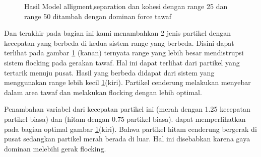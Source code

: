 \begin{figure}
\hfill
{}

\caption{Hasil Model alligment,separation dan kohesi dengan range 25 dan range 50 ditambah dengan dominan force tawaf}
\label{fig:2grafikmodel4gaya}
\end{figure}

Dan terakhir pada bagian ini kami menambahkan 2 jenis partikel dengan kecepatan yang berbeda di kedua sistem range yang berbeda. Disini dapat terlihat pada gambar \ref{fig:2grafikmodel4gaya} (kanan) ternyata range yang lebih besar mendistrupsi sistem flocking pada gerakan tawaf. Hal ini dapat terlihat dari partikel yang tertarik menuju pusat. Hasil yang berbeda didapat dari sistem yang menggunakan range lebih kecil \ref{fig:2grafikmodel4gaya}(kiri). Partikel cenderung melakukan menyebar dalam area tawaf dan melakukan flocking dengan lebih optimal. 

Penambahan variabel dari kecepatan partikel ini (merah dengan 1.25 kecepatan partikel biasa) dan (hitam dengan 0.75 partikel biasa). dapat memperlihatkan pada bagian optimal gambar  \ref{fig:2grafikmodel4gaya}(kiri). Bahwa partikel hitam cenderung bergerak di pusat sedangkan partikel merah berada di luar. Hal ini disebabkan karena gaya dominan melebihi gerak flocking.

